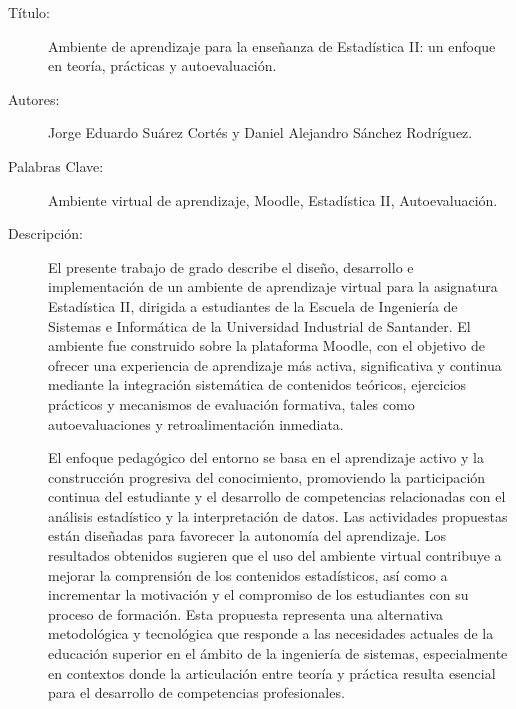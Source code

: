 \documentclass[letter,oneside,12pt,spanish]{report}
\begin{document}
\footnotesize{
\begin{description}
  \item[Título:] Ambiente de aprendizaje para la enseñanza de Estadística II: un enfoque en teoría, prácticas y autoevaluación.
  \item[Autores:] Jorge Eduardo Suárez Cortés y Daniel Alejandro Sánchez Rodríguez.
  \item[Palabras Clave:]Ambiente virtual de aprendizaje, Moodle, Estadística II, Autoevaluación.
  \item[Descripción:] El presente trabajo de grado describe el diseño, desarrollo e implementación 
  de un ambiente de aprendizaje virtual para la asignatura Estadística II, dirigida a estudiantes de 
  la Escuela de Ingeniería de Sistemas e Informática de la Universidad Industrial de Santander. El 
  ambiente fue construido sobre la plataforma Moodle, con el objetivo de ofrecer una experiencia de 
  aprendizaje más activa, significativa y continua mediante la integración sistemática de contenidos 
  teóricos, ejercicios prácticos y mecanismos de evaluación formativa, tales como autoevaluaciones y 
  retroalimentación inmediata.

  El enfoque pedagógico del entorno se basa en el aprendizaje activo y la construcción progresiva del 
  conocimiento, promoviendo la participación continua del estudiante y el desarrollo de competencias 
  relacionadas con el análisis estadístico y la interpretación de datos. Las actividades propuestas están 
  diseñadas para favorecer la autonomía del aprendizaje. Los resultados obtenidos sugieren que el uso del
  ambiente virtual contribuye a mejorar la comprensión de los contenidos estadísticos, así como a incrementar 
  la motivación y el compromiso de los estudiantes con su proceso de formación. Esta propuesta representa 
  una alternativa metodológica y tecnológica que responde a las necesidades actuales de la educación superior
  en el ámbito de la ingeniería de sistemas, especialmente en contextos donde la articulación entre teoría y 
  práctica resulta esencial para el desarrollo de competencias profesionales.
  
  
\end{description}}\normalsize

\end{document}
